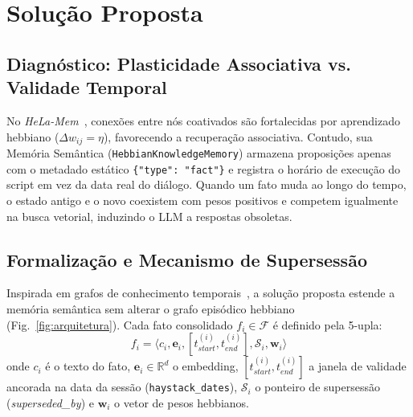 \documentclass[10pt,conference,twocolumn]{IEEEtran}
\begin{document}
\section{Solução Proposta}

\subsection{Diagnóstico: Plasticidade Associativa vs. Validade Temporal}
No \textit{HeLa-Mem}~\cite{helamem2026}, conexões entre nós coativados são fortalecidas por aprendizado hebbiano ($\Delta w_{ij} = \eta$), favorecendo a recuperação associativa. Contudo, sua Memória Semântica (\texttt{HebbianKnowledgeMemory}) armazena proposições apenas com o metadado estático \texttt{\{"type": "fact"\}} e registra o horário de execução do script em vez da data real do diálogo. Quando um fato muda ao longo do tempo, o estado antigo e o novo coexistem com pesos positivos e competem igualmente na busca vetorial, induzindo o LLM a respostas obsoletas.

\subsection{Formalização e Mecanismo de Supersessão}
Inspirada em grafos de conhecimento temporais~\cite{zep2025}, a solução proposta estende a memória semântica sem alterar o grafo episódico hebbiano (Fig.~\ref{fig:arquitetura}). Cada fato consolidado $f_i \in \mathcal{F}$ é definido pela 5-upla:
\begin{equation}
f_i = \langle c_i, \mathbf{e}_i, [t_{start}^{(i)}, t_{end}^{(i)}], \mathcal{S}_i, \mathbf{w}_i \rangle
\end{equation}
onde $c_i$ é o texto do fato, $\mathbf{e}_i \in \mathbb{R}^d$ o embedding, $[t_{start}^{(i)}, t_{end}^{(i)}]$ a janela de validade ancorada na data da sessão (\texttt{haystack\_dates}), $\mathcal{S}_i$ o ponteiro de supersessão (\textit{superseded\_by}) e $\mathbf{w}_i$ o vetor de pesos hebbianos.
\end{document}
